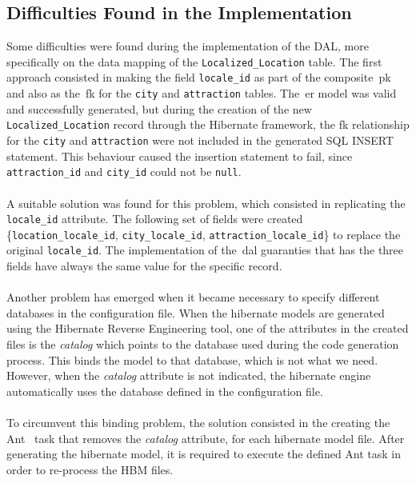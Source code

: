 \subsection{Difficulties Found in the Implementation}
\label{subsubsec:odi}
Some difficulties were found during the implementation of the DAL, more specifically on the data mapping of the \verb"Localized_Location" table. The first approach consisted in making the field \verb"locale_id" as part of the composite~\gls{pk} and also as the~\gls{fk} for the \verb"city" and \verb"attraction" tables. The~\gls{er} model was valid and successfully generated, but during the creation of the new \verb"Localized_Location" record through the Hibernate framework, the \gls{fk} relationship for the \verb"city" and \verb"attraction" were not included in the generated SQL INSERT statement. This behaviour caused the insertion statement to fail, since \verb"attraction_id" and \verb"city_id" could not be \verb"null".\\
\\
A suitable solution was found for this problem, which consisted in replicating the \verb"locale_id" attribute. The following set of fields were created \{\verb"location_locale_id", \verb"city_locale_id", \verb"attraction_locale_id"\} to replace the original \verb"locale_id".
The implementation of the~\gls{dal} guaranties that has the three fields have always the same value for the specific record.\\
\\
Another problem has emerged when it became necessary to specify different databases in the configuration file. When the hibernate models are generated using the Hibernate Reverse Engineering tool, one of the attributes in the created files is the \emph{catalog} which points to the database used during the code generation process. This binds the model to that database, which is not what we need. However, when the \emph{catalog} attribute is not indicated, the hibernate engine automatically uses the database defined in the configuration file.\\
\\
To circumvent this binding problem, the solution consisted in the creating the Ant~\cite{antTask} task that removes the \emph{catalog} attribute, for each hibernate model file. After generating the hibernate model, it is required to execute the defined Ant task in order to re-process the HBM files.

